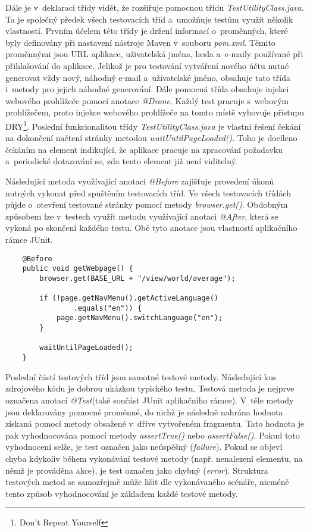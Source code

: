 \documentclass[
    color,   %
	table,   %
    twoside, %
    nolot, nolof,
]{fithesis3}
\begin{document}
Dále je v~deklaraci třídy vidět, že rozšiřuje pomocnou třídu \emph{TestUtilityClass.java}. Ta je společný předek všech testovacích tříd a~umožňuje testům využít několik vlastností. Prvním účelem této třídy je držení informací o~proměnných, které byly definovány při nastavení nástroje Maven v~souboru \emph{pom.xml}. Těmito proměnnými jsou URL aplikace, uživatelská jména, hesla a~e-maily používané při přihlašování do aplikace. Jelikož je pro testování vytváření nového účtu nutné generovat vždy nový, náhodný e-mail a~uživatelské jméno, obsahuje tato třída i~metody pro jejich náhodné generování. Dále pomocná třída obsahuje injekci webového prohlížeče pomocí anotace \emph{@Drone}. Každý test pracuje s~webovým prohlížečem, proto injekce webového prohlížeče na tomto místě vyhovuje přístupu DRY\footnote{Don't Repeat Yourself}. Poslední funkcionalitou třídy \emph{TestUtilityClass.java} je vlastní řešení čekání na dokončení načtení stránky metodou \emph{waitUntilPageLoaded()}. Toho je docíleno čekáním na element indikující, že aplikace pracuje na zpracování požadavku a~periodické dotazování se, zda tento element již není viditelný.

Následující metoda využívající anotaci \emph{@Before} zajišťuje provedení úkonů nutných vykonat před spuštěním testovacích tříd. Ve všech testovacích třídách půjde o~otevření testované stránky pomocí metody \emph{browser.get()}. Obdobným způsobem lze v~testech využít metodu využívající anotaci \emph{@After}, která se vykoná po skončení každého testu. Obě tyto anotace jsou vlastností aplikačního rámce JUnit.

\begin{lstlisting}
	@Before
	public void getWebpage() {
		browser.get(BASE_URL + "/view/world/average");
		
		if (!page.getNavMenu().getActiveLanguage()
				.equals("en")) {
			page.getNavMenu().switchLanguage("en");
		}
		
		waitUntilPageLoaded();
	}
\end{lstlisting} 

Poslední částí testových tříd jsou samotné testové metody. Následující kus zdrojového kódu je dobrou ukázkou typického testu. Testová metoda je nejprve označena anotací \emph{@Test}(také součást JUnit aplikačního rámce). V~těle metody jsou deklarovány pomocné proměnné, do nichž je následně nahrána hodnota získaná pomocí metody obsažené v~dříve vytvořeném fragmentu. Tato hodnota je pak vyhodnocována pomocí metody \emph{assertTrue()} nebo  \emph{assertFalse()}. Pokud toto vyhodnocení selže, je test označen jako neúspěšný (\emph{failure}). Pokud se objeví chyba kdykoliv během vykonávání testové metody (např. nenalezení elementu, na němž je prováděna akce), je test označen jako chybný (\emph{error}). Struktura testových metod se samozřejmě může lišit dle vykonávaného scénáře, nicméně tento způsob vyhodnocování je základem každé testové metody.
\end{document}
